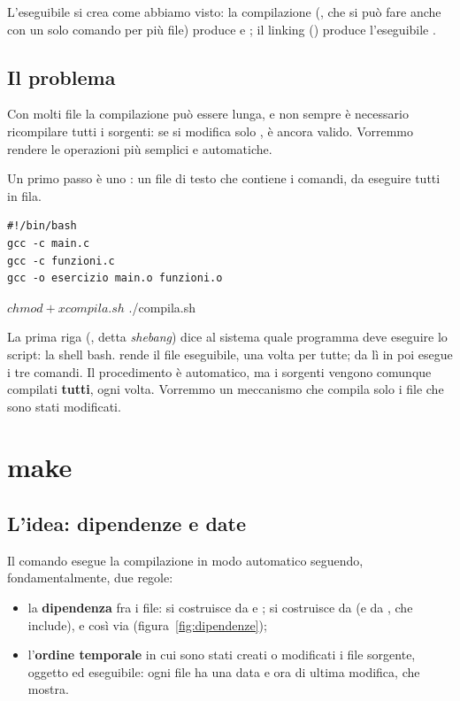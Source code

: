 L'eseguibile si crea come abbiamo visto: la compilazione
(, che si può fare anche con un solo comando
per più file) produce  e ; il linking
() produce l'eseguibile
.

\subsection{Il problema}

Con molti file la compilazione può essere lunga, e non sempre è necessario
ricompilare tutti i sorgenti: se si modifica solo ,
 è ancora valido. Vorremmo rendere le operazioni più semplici
e automatiche.

Un primo passo è uno : un file di testo che contiene i comandi,
da eseguire tutti in fila.

\begin{affianco}[0.5][c]
\begin{lstlisting}[style=shell, name=compila.sh]
#!/bin/bash
gcc -c main.c
gcc -c funzioni.c
gcc -o esercizio main.o funzioni.o
\end{lstlisting}
\risultato
\begin{console}
$ chmod +x compila.sh
$ ./compila.sh
\end{console}
\end{affianco}

La prima riga (, detta \textit{shebang}) dice al sistema
quale programma deve eseguire lo script: la shell bash. 
rende il file eseguibile, una volta per tutte; da lì in poi
 esegue i tre comandi. Il procedimento è automatico, ma i
sorgenti vengono comunque compilati \textbf{tutti}, ogni volta. Vorremmo un
meccanismo che compila solo i file che sono stati modificati.

\section{make}

\subsection{L'idea: dipendenze e date}

Il comando  esegue la compilazione in modo automatico seguendo,
fondamentalmente, due regole:

\begin{itemize}
  \item la \textbf{dipendenza} fra i file:  si costruisce da
         e ;  si costruisce da
         (e da , che  include), e
        così via (figura~\ref{fig:dipendenze});
  \item l'\textbf{ordine temporale} in cui sono stati creati o modificati i
        file sorgente, oggetto ed eseguibile: ogni file ha una data e ora di
        ultima modifica, che  mostra.
\end{itemize}

